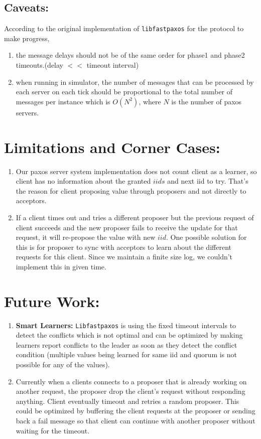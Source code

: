 \subsection {Caveats:}
According to the original implementation of \texttt{libfastpaxos} for the protocol to make progress,
\begin{enumerate}
\item the message delays should not be of the same order for phase1 and phase2 timeouts.(delay $<<$ timeout interval)
\item when running in simulator, the number of messages that can be processed by each server on each tick should be proportional to the total number of messages per instance which is $O(N^2)$, where $N$ is the number of paxos servers.
\end{enumerate}

\section{Limitations and Corner Cases:}
\begin{enumerate}
\item Our paxos server system implementation does not count client as a learner, so client has no information about the granted $iids$ and next iid to try. That's the reason for client proposing value through proposers and not directly to acceptors.

\item If a client times out and tries a different proposer but the previous request of client succeeds and the new proposer fails to receive the update for that request, it will re-propose the value with new $iid$. One possible solution for this is for proposer to sync with acceptors to learn about the different requests for this client. Since we maintain a finite size log, we couldn't implement this in given time.
\end{enumerate}

\section {Future Work:}
\begin{enumerate}
\item \textbf{Smart Learners:} \texttt{Libfastpaxos} is using the fixed timeout intervals to detect the conflicts which is not optimal and can be optimized by making learners report conflicts to the leader as soon as they detect the conflict condition (multiple values being learned for same iid and quorum is not possible for any of the values).
\item Currently when a clients connects to a proposer that is already working on another request, the proposer drop the client's request without responding anything. Client eventually timeout and retries a random proposer. This could be optimized by buffering the client requests at the proposer or sending back a fail message so that client can continue with another proposer without waiting for the timeout.
\end{enumerate}

